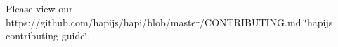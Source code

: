 Please view our https\+://github.com/hapijs/hapi/blob/master/\+C\+O\+N\+T\+R\+I\+B\+U\+T\+I\+N\+G.\+md \char`\"{}hapijs contributing guide\char`\"{}. 